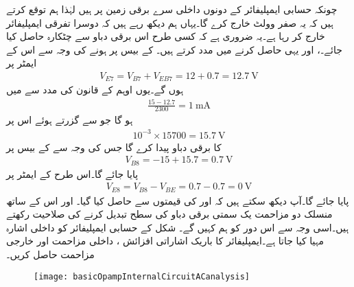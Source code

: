 چونکہ حسابی ایمپلیفائر کے دونوں داخلی سرے برقی زمین پر ہیں لہٰذا ہم توقع کرتے ہیں کہ یہ صفر وولٹ خارج کرے گا۔یہاں ہم دیکھ رہے ہیں کہ دوسرا  تفرقی ایمپلیفائر  خارج کر رہا ہے۔یہ ضروری ہے کہ کسی طرح اس برقی دباو سے چٹکارہ حاصل کیا جائے۔،  اور  یہی حاصل کرنے میں مدد کرتے ہیں۔ کے بیس پر  ہونے کی وجہ سے اس کے ایمٹر پر 
\begin{align*}
V_{E7}=V_{B7}+V_{EB7}=12+0.7=\SI{12.7}{\volt}
\end{align*}
ہوں گے۔یوں اوہم کے قانون کی مدد سے  میں
\begin{align*}
\frac{15-12.7}{2300}=\SI{1}{\milli \ampere}
\end{align*}
ہو گا جو  سے گزرتے ہوئے اس پر
\begin{align*}
10^{-3} \times 15700=\SI{15.7}{\volt}
\end{align*}
کا برقی دباو پیدا کرے گا جس کی وجہ سے  کے بیس پر
\begin{align*}
V_{B8}=-15+15.7=\SI{0.7}{\volt}
\end{align*}
پایا جائے گا۔اس طرح  کے ایمٹر پر
\begin{align*}
V_{E8}=V_{B8}-V_{BE}=0.7-0.7=\SI{0}{\volt}
\end{align*}
پایا جائے گا۔آپ دیکھ سکتے ہیں کہ  اور  کی قیمتوں سے  حاصل کیا گیا۔ اور اس کے ساتھ منسلک دو مزاحمت یک سمتی برقی دباو کی سطح تبدیل کرنے کی صلاحیت رکھتے ہیں۔اسی وجہ سے اس دور کو ہم  کہیں گے۔
شکل  کے حسابی ایمپلیفائر کو داخلی اشارہ  مہیا کیا جاتا ہے۔ایمپلیفائر کا باریک اشاراتی افزائش ، داخلی مزاحمت اور خارجی مزاحمت حاصل کریں۔
\begin{figure}
\centering
\texttt{[image: basicOpampInternalCircuitACanalysis]}
\caption{}
\label{شکل_تفرقی_حسابی_ایمپلیفائر_دور_بدلتا_مساوی_دور}
\end{figure}

